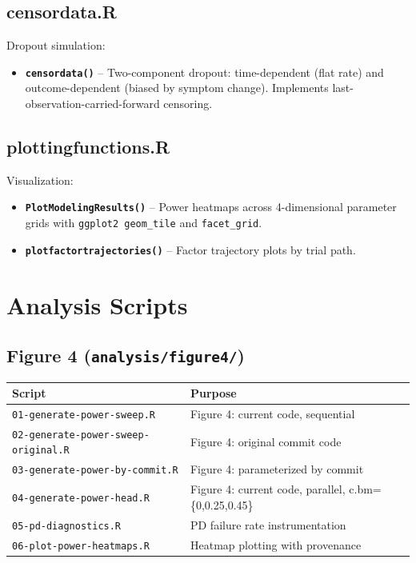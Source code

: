 \documentclass[11pt]{article}
\begin{document}
\subsection{censordata.R}

Dropout simulation:

\begin{itemize}
  \item \textbf{\texttt{censordata()}} -- Two-component dropout: time-dependent
    (flat rate) and outcome-dependent (biased by symptom
    change). Implements last-observation-carried-forward
    censoring.
\end{itemize}

\subsection{plottingfunctions.R}

Visualization:

\begin{itemize}
  \item \textbf{\texttt{PlotModelingResults()}} -- Power heatmaps across
    4-dimensional parameter grids with \texttt{ggplot2 geom\_tile}
    and \texttt{facet\_grid}.
  \item \textbf{\texttt{plotfactortrajectories()}} -- Factor trajectory plots
    by trial path.
\end{itemize}

\section{Analysis Scripts}

\subsection{Figure 4 (\texttt{analysis/figure4/})}

\begin{table}[h]
\centering
\begin{tabular}{ll}
\toprule
Script & Purpose \\
\midrule
\texttt{01-generate-power-sweep.R} & Figure 4: current code, sequential \\
\texttt{02-generate-power-sweep-original.R} & Figure 4: original commit code \\
\texttt{03-generate-power-by-commit.R} & Figure 4: parameterized by commit \\
\texttt{04-generate-power-head.R} & Figure 4: current code, parallel, c.bm=\{0,0.25,0.45\} \\
\texttt{05-pd-diagnostics.R} & PD failure rate instrumentation \\
\texttt{06-plot-power-heatmaps.R} & Heatmap plotting with provenance \\
\bottomrule
\end{tabular}
\end{table}
\end{document}
